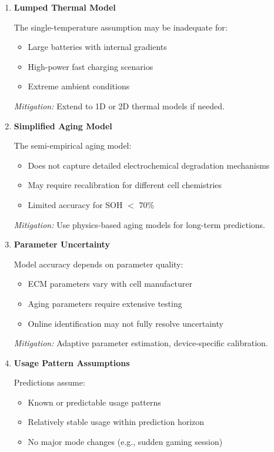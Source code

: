 \begin{enumerate}
    \item \textbf{Lumped Thermal Model}
    
    The single-temperature assumption may be inadequate for:
    \begin{itemize}
        \item Large batteries with internal gradients
        \item High-power fast charging scenarios
        \item Extreme ambient conditions
    \end{itemize}
    
    \textit{Mitigation:} Extend to 1D or 2D thermal models if needed.
    
    \item \textbf{Simplified Aging Model}
    
    The semi-empirical aging model:
    \begin{itemize}
        \item Does not capture detailed electrochemical degradation mechanisms
        \item May require recalibration for different cell chemistries
        \item Limited accuracy for SOH $<$ 70\%
    \end{itemize}
    
    \textit{Mitigation:} Use physics-based aging models for long-term predictions.
    
    \item \textbf{Parameter Uncertainty}
    
    Model accuracy depends on parameter quality:
    \begin{itemize}
        \item ECM parameters vary with cell manufacturer
        \item Aging parameters require extensive testing
        \item Online identification may not fully resolve uncertainty
    \end{itemize}
    
    \textit{Mitigation:} Adaptive parameter estimation, device-specific calibration.
    
    \item \textbf{Usage Pattern Assumptions}
    
    Predictions assume:
    \begin{itemize}
        \item Known or predictable usage patterns
        \item Relatively stable usage within prediction horizon
        \item No major mode changes (e.g., sudden gaming session)
    \end{itemize}
    

\end{enumerate}
